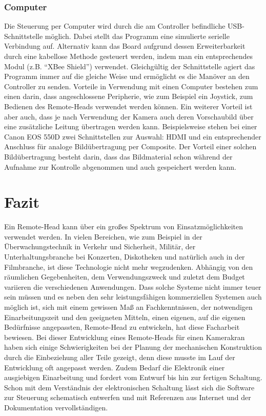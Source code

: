 \documentclass[a4paper, 12pt, bibtotocnumbered, liststotocnumbered]{scrartcl}
\begin{document}
	\subsubsection{Computer}
	Die Steuerung per Computer wird durch die am Controller befindliche USB-Schnittstelle möglich. Dabei stellt das Programm eine simulierte serielle Verbindung auf. Alternativ kann das Board aufgrund dessen Erweiterbarkeit durch eine kabellose Methode gesteuert werden, indem man ein entsprechendes Modul (z.B. “XBee Shield”) verwendet. Gleichgültig der Schnittstelle agiert das Programm immer auf die gleiche Weise und ermöglicht es die Manöver an den Controller zu senden. Vorteile in Verwendung mit einen Computer bestehen zum einen darin, dass angeschlossene Peripherie, wie zum Beispiel ein Joystick, zum Bedienen des Remote-Heads verwendet werden können. Ein weiterer Vorteil ist aber auch, dass je nach Verwendung der Kamera auch deren Vorschaubild über eine zusätzliche Leitung übertragen werden kann. Beispielsweise stehen bei einer Canon EOS 550D zwei Schnittstellen zur Auswahl: HDMI und ein entsprechender Anschluss für analoge Bildübertragung per Composite. Der Vorteil einer solchen Bildübertragung besteht darin, dass das Bildmaterial schon während der Aufnahme zur Kontrolle abgenommen und auch gespeichert werden kann.

	\section{Fazit}
	Ein Remote-Head kann über ein großes Spektrum von Einsatzmöglichkeiten verwendet werden. In vielen Bereichen, wie zum Beispiel in der Überwachungstechnik in Verkehr und Sicherheit, Militär, der Unterhaltungsbranche bei Konzerten, Diskotheken und natürlich auch in der Filmbranche, ist diese Technologie nicht mehr wegzudenken.  Abhängig von den räumlichen Gegebenheiten, dem Verwendungszweck und zuletzt dem Budget variieren die verschiedenen Anwendungen. Dass solche Systeme nicht immer teuer sein müssen und es neben den sehr leistungsfähigen kommerziellen Systemen auch möglich ist, sich mit einem gewissen Maß an Fachkenntnissen, der notwendigen Einarbeitungszeit und den geeigneten Mitteln, einen eigenen, auf die eigenen Bedürfnisse angepassten, Remote-Head zu entwickeln, hat diese Facharbeit bewiesen. Bei dieser Entwicklung eines Remote-Heads für einen Kamerakran haben sich einige Schwierigkeiten bei der Planung der mechanischen Konstruktion durch die Einbeziehung aller Teile gezeigt, denn diese musste im Lauf der Entwicklung oft angepasst werden. Zudem Bedarf die Elektronik einer ausgiebigen Einarbeitung und fordert vom Entwurf bis hin zur fertigen Schaltung. Schon mit dem Verständnis der elektronischen Schaltung lässt sich die Software zur Steuerung schematisch entwerfen und mit Referenzen aus Internet und der Dokumentation vervollständigen.
\end{document}
